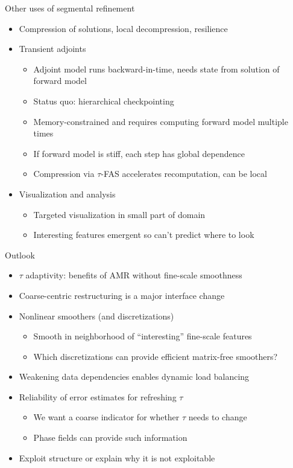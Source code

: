 \documentclass{beamer}
\begin{document}
\begin{frame}{Other uses of segmental refinement}
  \begin{itemize}
  \item Compression of solutions, local decompression, resilience
  \item Transient adjoints
    \begin{itemize}
    \item Adjoint model runs backward-in-time, needs state from solution of forward model
    \item Status quo: hierarchical checkpointing
    \item Memory-constrained and requires computing forward model multiple times
    \item If forward model is stiff, each step has global dependence
    \item Compression via $\tau$-FAS accelerates recomputation, can be local
    \end{itemize}
  \item Visualization and analysis
    \begin{itemize}
    \item Targeted visualization in small part of domain
    \item Interesting features emergent so can't predict where to look
    \end{itemize}
  \end{itemize}
\end{frame}

\begin{frame}{Outlook}
  \begin{itemize}
  \item $\tau$ adaptivity: benefits of AMR without fine-scale smoothness
  \item Coarse-centric restructuring is a major interface change
  \item Nonlinear smoothers (and discretizations)
    \begin{itemize}
    \item Smooth in neighborhood of ``interesting'' fine-scale features
    \item Which discretizations can provide efficient matrix-free smoothers?
    \end{itemize}
  \item Weakening data dependencies enables dynamic load balancing
  \item Reliability of error estimates for refreshing $\tau$
    \begin{itemize}
    \item We want a coarse indicator for whether $\tau$ needs to change
    \item Phase fields can provide such information
    \end{itemize}
  \item Exploit structure or explain why it is not exploitable
  \end{itemize}
\end{frame}
\end{document}
